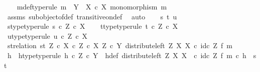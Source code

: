 \begin{isabellebody}
\isanewline
\ \ \isamarkupfalse%
\ m{\isacharunderscore}{\kern0pt}def{\isacharbrackleft}{\kern0pt}type{\isacharunderscore}{\kern0pt}rule{\isacharbrackright}{\kern0pt}{\isacharcolon}{\kern0pt}\ {\isachardoublequoteopen}m\ {\isacharcolon}{\kern0pt}\ Y\ {\isasymrightarrow}\ X\ {\isasymtimes}\isactrlsub c\ X{\isachardoublequoteclose}\ {\isachardoublequoteopen}monomorphism\ m{\isachardoublequoteclose}\isanewline
\ \ \ \ \isamarkupfalse%
\ assms\ subobject{\isacharunderscore}{\kern0pt}of{\isacharunderscore}{\kern0pt}def{}\ transitive{\isacharunderscore}{\kern0pt}on{\isacharunderscore}{\kern0pt}def\ \isamarkupfalse%
\ auto\isanewline
\isanewline
\ \ \isamarkupfalse%
\ s\ t\ u\isanewline
\ \ \isamarkupfalse%
\ s{\isacharunderscore}{\kern0pt}type{\isacharbrackleft}{\kern0pt}type{\isacharunderscore}{\kern0pt}rule{\isacharbrackright}{\kern0pt}{\isacharcolon}{\kern0pt}\ {\isachardoublequoteopen}s\ {\isasymin}\isactrlsub c\ Z\ {\isasymtimes}\isactrlsub c\ X{\isachardoublequoteclose}\isanewline
\ \ \isamarkupfalse%
\ t{\isacharunderscore}{\kern0pt}type{\isacharbrackleft}{\kern0pt}type{\isacharunderscore}{\kern0pt}rule{\isacharbrackright}{\kern0pt}{\isacharcolon}{\kern0pt}\ {\isachardoublequoteopen}t\ {\isasymin}\isactrlsub c\ Z\ {\isasymtimes}\isactrlsub c\ X{\isachardoublequoteclose}\isanewline
\ \ \isamarkupfalse%
\ u{\isacharunderscore}{\kern0pt}type{\isacharbrackleft}{\kern0pt}type{\isacharunderscore}{\kern0pt}rule{\isacharbrackright}{\kern0pt}{\isacharcolon}{\kern0pt}\ {\isachardoublequoteopen}u\ {\isasymin}\isactrlsub c\ Z\ {\isasymtimes}\isactrlsub c\ X{\isachardoublequoteclose}\isanewline
\ \ \isamarkupfalse%
\ st{\isacharunderscore}{\kern0pt}relation{\isacharcolon}{\kern0pt}\ {\isachardoublequoteopen}{\isasymlangle}s{\isacharcomma}{\kern0pt}t{\isasymrangle}\ {\isasymin}\isactrlbsub {\isacharparenleft}{\kern0pt}Z\ {\isasymtimes}\isactrlsub c\ X{\isacharparenright}{\kern0pt}\ {\isasymtimes}\isactrlsub c\ Z\ {\isasymtimes}\isactrlsub c\ X\isactrlesub \ {\isacharparenleft}{\kern0pt}Z\ {\isasymtimes}\isactrlsub c\ Y{\isacharcomma}{\kern0pt}\ distribute{\isacharunderscore}{\kern0pt}left\ Z\ X\ X\ {\isasymcirc}\isactrlsub c\ id\isactrlsub c\ Z\ {\isasymtimes}\isactrlsub f\ m{\isacharparenright}{\kern0pt}{\isachardoublequoteclose}\isanewline
\ \ \isamarkupfalse%
\ \isamarkupfalse%
\ h\ \ h{\isacharunderscore}{\kern0pt}type{\isacharbrackleft}{\kern0pt}type{\isacharunderscore}{\kern0pt}rule{\isacharbrackright}{\kern0pt}{\isacharcolon}{\kern0pt}\ {\isachardoublequoteopen}h\ {\isasymin}\isactrlsub c\ Z\ {\isasymtimes}\isactrlsub c\ Y{\isachardoublequoteclose}\ \ h{\isacharunderscore}{\kern0pt}def{\isacharcolon}{\kern0pt}\ {\isachardoublequoteopen}{\isacharparenleft}{\kern0pt}distribute{\isacharunderscore}{\kern0pt}left\ Z\ X\ X\ \ {\isasymcirc}\isactrlsub c\ id\isactrlsub c\ Z\ {\isasymtimes}\isactrlsub f\ m{\isacharparenright}{\kern0pt}\ {\isasymcirc}\isactrlsub c\ h\ {\isacharequal}{\kern0pt}\ {\isasymlangle}s{\isacharcomma}{\kern0pt}t{\isasymrangle}{\isachardoublequoteclose}\isanewline

\end{isabellebody}
